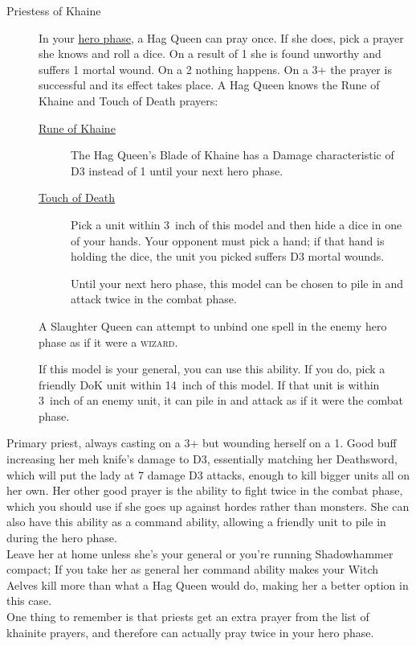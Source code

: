 \begin{description}
    \item [Priestess of Khaine] In your \hyperref[hero-phase]{hero phase},
        a Hag Queen can pray once. If she does, pick a prayer she knows and
        roll a dice. On a result of 1 she is found unworthy and suffers
        1 mortal wound. On a 2 nothing happens. On a 3+ the prayer is
          successful and its effect takes place.  A Hag Queen knows the Rune of
          Khaine and Touch of Death prayers:
        \begin{description}
            \item [{\hyperref[rune-of-khaine]{Rune of Khaine}}] The Hag Queen's
                Blade of Khaine has a Damage characteristic of D3 instead of
                1 until your next hero phase.
            \item [{\hyperref[touch-of-death]{Touch of Death}}] Pick a unit within
                3~inch of this model and then hide a dice in one of your hands.
                Your opponent must pick a hand; if that hand is holding the
                dice, the unit you picked suffers D3 mortal wounds.
            \item [] Until your next hero
                phase, this model can be chosen to pile in and attack twice in
                the combat phase.
        \end{description}
    \item [] A Slaughter Queen can
        attempt to unbind one spell in the enemy hero phase as if it were
        a \textsc{wizard}.
    \item [] If this model is
        your general, you can use this ability. If you do, pick a friendly
        DoK unit within 14~inch of this model. If that unit is
        within 3~inch of an enemy unit, it can pile in and attack as if it were the
        combat phase.
\end{description}

Primary priest, always casting on a 3+ but wounding herself on a 1.
Good buff increasing her meh knife's damage to D3, essentially matching her Deathsword,
which will put the lady at 7 damage D3 attacks, enough to kill bigger units all
on her own. Her other good prayer is the ability to fight twice in the combat
phase, which you should use if she goes up against hordes rather than monsters.
She can also have this ability as a command ability, allowing a friendly unit
to pile in during the hero phase. \\
Leave her at home unless she's your general or you're running Shadowhammer
compact; If you take her as general her command ability makes your Witch
Aelves kill more than what a Hag Queen would do, making her a better option in
this case. \\
One thing to remember is that priests get an extra prayer from the list of
khainite prayers, and therefore can actually pray twice in your hero phase.


